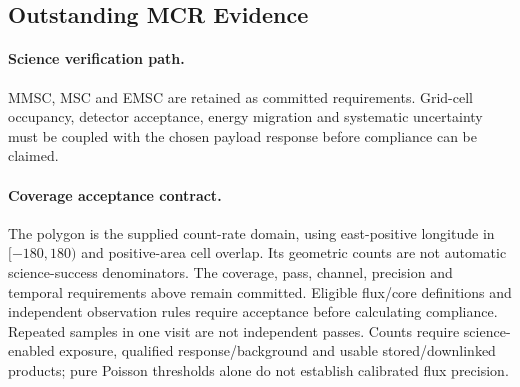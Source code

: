 \subsection{Outstanding MCR Evidence}
\paragraph{Science verification path.} MMSC, MSC and EMSC are retained as committed requirements. Grid-cell occupancy, detector acceptance, energy migration and systematic uncertainty must be coupled with the chosen payload response before compliance can be claimed.

\paragraph{Coverage acceptance contract.} The polygon is the supplied count-rate domain, using east-positive longitude in $[-180,180)$ and positive-area cell overlap. Its geometric counts are not automatic science-success denominators. The coverage, pass, channel, precision and temporal requirements above remain committed. Eligible flux/core definitions and independent observation rules require acceptance before calculating compliance. Repeated samples in one visit are not independent passes. Counts require science-enabled exposure, qualified response/background and usable stored/downlinked products; pure Poisson thresholds alone do not establish calibrated flux precision.
